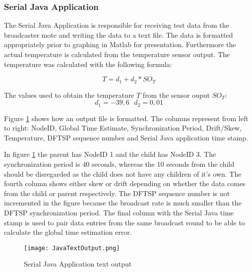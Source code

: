 \documentclass[Main]{subfiles}
\begin{document}
	

		
		\subsubsection{Serial Java Application} %
		\label{sub:serial_java_application}
			The Serial Java Application is responsible for receiving test data from the broadcaster mote and writing the data to a text file.
			The data is formatted appropriately prior to graphing in Matlab for presentation.
			Furthermore the actual temperature is calculated from the temperature sensor output.
			The temperature was calculated with the following formula\cite{tempSensorDatasheet}:

			\begin{equation}
			T = d_1 + d_2 * SO_T
			\end{equation} 

			The values used to obtain the temperature $T$ from the sensor ouput $SO_T$:
			\begin{equation}
			d_1 = -39,6\ \ \ d_2 = 0,01
			\end{equation} 

			Figure \ref{fig:JavaTextOutput} shows how an output file is formatted.
			The columns represent from left to right: NodeID, Global Time Estimate, Synchronization Period, Drift/Skew, Temperature, DFTSP sequence number and Serial Java application time stamp.
			
			In figure \ref{fig:JavaTextOutput} the parent has NodeID 1 and the child has NodeID 3.
			The synchronization period is 40 seconds, whereas the 10 seconds from the child should be disregarded as the child does not have any children of it's own.
			The fourth column shows either skew or drift depending on whether the data comes from the child or parent respectively.
			The DFTSP sequence number is not incremented in the figure because the broadcast rate is much smaller than the DFTSP synchronization period.
			The final column with the Serial Java time stamp is used to pair data entries from the same broadcast round to be able to calculate the global time estimation error.

			\begin{figure}[H]
				\centering
				\texttt{[image: JavaTextOutput.png]}
				\caption{Serial Java Application text output}
				\label{fig:JavaTextOutput}
			\end{figure}
\end{document}
